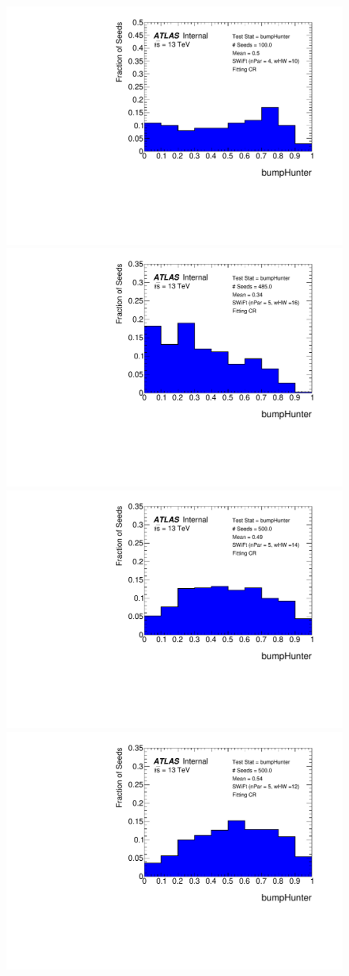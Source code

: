 \begin{figure}[!htb]
{}                                                                                              
 {                                                    
  \includegraphics[width=0.3\linewidth, angle=0]{figs/Dibjet/LowMass/FitStudy/pVal_bumpHunter_corrFitCR_4para_low10_high10.pdf}
}                                                                                              
 {                                                    
  \includegraphics[width=0.3\linewidth, angle=0]{figs/Dibjet/LowMass/FitStudy/pVal_bumpHunter_corrFitCR_5para_low16_high16.pdf}
}                                                                                              
 {                                                    
  \includegraphics[width=0.3\linewidth, angle=0]{figs/Dibjet/LowMass/FitStudy/pVal_bumpHunter_corrFitCR_5para_low14_high14.pdf}
}                                                                                              
 {                                                    
  \includegraphics[width=0.3\linewidth, angle=0]{figs/Dibjet/LowMass/FitStudy/pVal_bumpHunter_corrFitCR_5para_low12_high12.pdf}
}                                                                                              

\end{figure}
